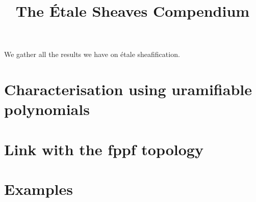 \documentclass{../util/zariski}
\title{The \'Etale Sheaves Compendium}
\begin{document}
\maketitle

We gather all the results we have on \'etale sheafification.

\tableofcontents

\section{Characterisation using uramifiable polynomials}


\section{Link with the fppf topology}


\section{Examples}





\printindex

\printbibliography
\end{document}
